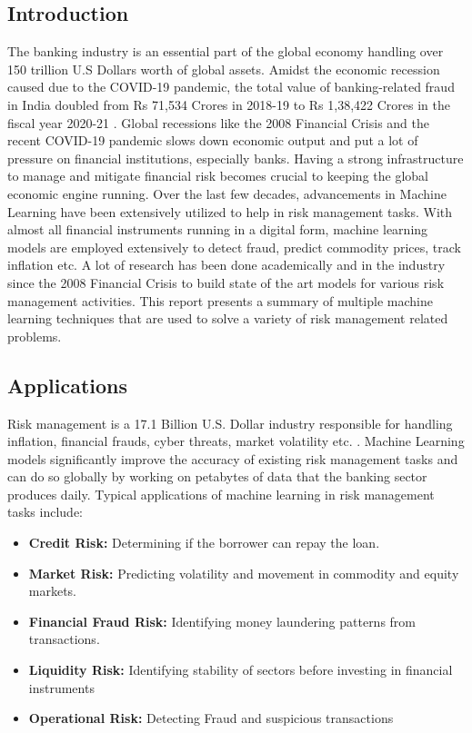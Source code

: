 \documentclass[a4paper, 12pt]{article}
\begin{document}
\begin{center}
\newpage
{}
\setcounter{page}{1}
\section{\centering Introduction}
\end{center}
\vskip 0.25in
The banking industry is an essential part of the global economy handling over 150 trillion U.S Dollars worth of global assets. Amidst the economic recession caused due to the COVID-19 pandemic, the total value of banking-related fraud in India doubled from Rs 71,534 Crores in 2018-19 to Rs 1,38,422 Crores in the fiscal year  2020-21 \cite{rbi21}. Global recessions like the 2008 Financial Crisis and the recent COVID-19 pandemic slows down economic output and put a lot of pressure on financial institutions, especially banks. Having a strong infrastructure to manage and mitigate financial risk becomes crucial to keeping the global economic engine running.
\vskip 0.2in
\noindent
Over the last few decades, advancements in Machine Learning have been extensively utilized to help in risk management tasks. With almost all financial instruments running in a digital form, machine learning models are employed extensively to detect fraud, predict commodity prices, track inflation etc. A lot of research has been done academically and in the industry since the 2008 Financial Crisis to build state of the art models for various risk management activities. This report presents a summary of multiple machine learning techniques that are used to solve a variety of risk management related problems.
\vskip 0.2in
\subsection{Applications}
Risk management is a 17.1 Billion U.S. Dollar industry responsible for handling inflation, financial frauds, cyber threats, market volatility etc. \cite{bcc17}. Machine Learning models significantly improve the accuracy of existing risk management tasks and can do so globally by working on petabytes of data that the banking sector produces daily. Typical applications of machine learning in risk management tasks include:

\begin{itemize}
  \item \textbf{Credit Risk:} Determining if the borrower can repay the loan.
  \item \textbf{Market Risk:} Predicting volatility and movement in commodity and equity markets.
  \item \textbf{Financial Fraud Risk:} Identifying money laundering patterns from transactions.
  \item \textbf{Liquidity Risk:} Identifying stability of sectors before investing in financial instruments
  \item \textbf{Operational Risk:} Detecting Fraud and suspicious transactions
\end{itemize}
\end{document}
